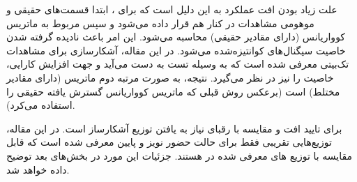 علت زیاد بودن افت عملکرد به این دلیل است که برای ، ابتدا قسمت‌های حقیقی و موهومی مشاهدات در کنار هم قرار داده می‌شود و سپس  مربوط به ماتریس کوواریانس (دارای مقادیر حقیقی) محاسبه می‌شود. این امر باعث نادیده گرفته شدن خاصیت  سیگنال‌های کوانتیزه‌شده می‌شود.
در این مقاله، آشکارسازی برای مشاهدات تک‌بیتی معرفی شده است که به وسیله تست  به دست می‌آيد و جهت افزایش کارایی، خاصیت  را نیز در نظر می‌گیرد. نتیجه، به صورت  مرتبه دوم ماتریس  (دارای مقادیر مختلط) است (برعکس روش قبلی که ماتریس کوواریانس گسترش یافته حقیقی را استفاده می‌کرد).

برای تایید افت  و مقایسه با رقبای
نیاز به یافتن توزیع آشکارساز است. در این مقاله، توزیع‌هایی تقریبی فقط برای حالت حضور نویز و  پایین معرفی شده است که قابل مقایسه با توزیع های معرفی شده در  هستند. جزئیات این مورد در بخش‌های بعد توضیح داده خواهد شد.






